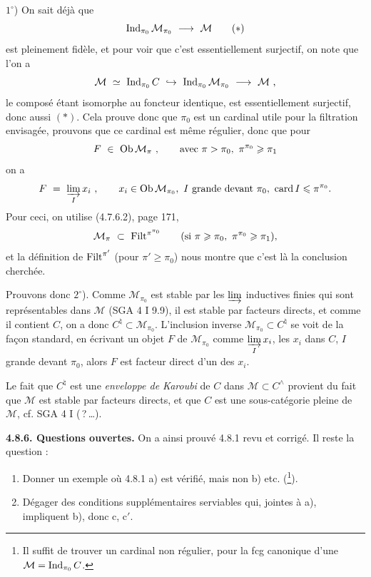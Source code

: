 $1^\circ$) On sait déjà que
\[
\operatorname{Ind}_{\pi_0}\mathcal{M}_{\pi_0} \ \longrightarrow \ \mathcal{M} \tag*{$(*)$}
\]
est pleinement fidèle, et pour voir que c'est essentiellement surjectif, on note que l'on a
\[
\mathcal{M} \ \simeq \ \Ind_{\pi_0}C \ \hookrightarrow \ \Ind_{\pi_0}\mathcal{M}_{\pi_0} \ \longrightarrow \ \mathcal{M} \ ,
\]
le composé étant isomorphe au foncteur identique, est essentiellement surjectif, donc aussi $(*)$. Cela prouve donc que $\pi_0$ est un cardinal utile pour la filtration envisagée, prouvons que ce cardinal est même régulier, donc que pour
\[
F \ \in \ \Ob\mathcal{M}_\pi \ , \qquad \text{avec } \pi>\pi_0,\ \pi^{\pi_0}\geqslant\pi_1
\]
on a
\[
F \ = \ \varinjlim_I x_i \ , \qquad x_i\in\Ob\mathcal{M}_{\pi_0},\ I \text{ grande devant } \pi_0,\ \card I\leqslant\pi^{\pi_0}.
\]
Pour ceci, on utilise (4.7.6.2), page 171,
\[
\mathcal{M}_\pi \ \subset \ \Filt^{\pi^{\pi_0}} \qquad (\text{si } \pi\geqslant\pi_0,\ \pi^{\pi_0}\geqslant\pi_1),
\]
et la définition de $\operatorname{Filt}^{\pi'}$ (pour $\pi'\geqslant\pi_0$) nous montre que c'est là la conclusion cherchée.

Prouvons donc $2^\circ$). Comme $\mathcal{M}_{\pi_0}$ est stable par les $\varinjlim$ inductives finies qui sont représentables dans $\mathcal{M}$ (SGA 4 I 9.9), il est stable par facteurs directs, et comme il contient $C$, on a donc $C^\natural\subset\mathcal{M}_{\pi_0}$. L'inclusion inverse $\mathcal{M}_{\pi_0}\subset C^\natural$ se voit de la façon standard, en écrivant un objet $F$ de $\mathcal{M}_{\pi_0}$ comme $\varinjlim\limits_I x_i$, les $x_i$ dans $C$, $I$ grande devant $\pi_0$, alors $F$ est facteur direct d'un des $x_i$.

Le fait que $C^\natural$ est une \textit{enveloppe de Karoubi} de $C$ dans $\mathcal{M}\subset C^\wedge$ provient du fait que $\mathcal{M}$ est stable par facteurs directs, et que $C$ est une sous-catégorie pleine de $\mathcal{M}$, cf. SGA 4 I (\,?\,\dots).

\textbf{4.8.6. Questions ouvertes.} On a ainsi prouvé 4.8.1 revu et corrigé. Il reste la question :
\begin{enumerate}
\item[1)] Donner un exemple où 4.8.1 a) est vérifié, mais non b) etc. (\footnote{Il suffit de trouver un cardinal non régulier, pour la fcg canonique d'une $\mathcal{M}=\operatorname{Ind}_{\pi_0}C$.}).
\item[2)] Dégager des conditions supplémentaires serviables qui, jointes à a), impliquent b), donc c, c$'$.
\end{enumerate}

